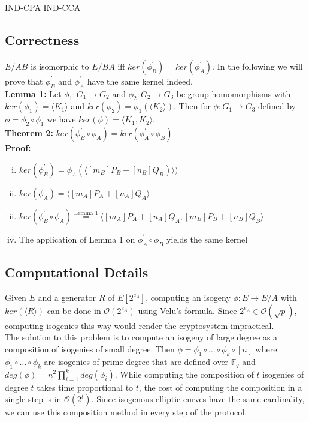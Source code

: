 IND-CPA %
IND-CCA %


\subsection{Correctness}
\label{ch:correctness}

$E/AB$ is isomorphic to $E/BA$ iff $ker(\phi_B^{\prime})=ker(\phi_A^{\prime})$. %
In the following we will prove that $\phi_B^{\prime}$ and $\phi_A^{\prime}$ have the same kernel indeed.\\

\textbf{Lemma 1:} Let $\phi_1: G_1 \to G_2$ and $\phi_2: G_2 \to G_3$ be group homomorphisms with $ker(\phi_1) = \langle K_1 \rangle$ and $ker(\phi_2) = \phi_1(\langle K_2 \rangle)$. Then for $\phi:G_1 \to G_3$ defined by $\phi=\phi_2 \circ \phi_1$ we have $ker(\phi) =\langle K_1,K_2\rangle$.\\%

\textbf{Theorem 2:} $ker(\phi_B^{\prime} \circ \phi_A) = ker(\phi_A^{\prime} \circ \phi_B)$\\
\textbf{Proof:}
\begin{enumerate}[(i)]
	\item $ker(\phi_B^{\prime})=\phi_A(\langle [m_B]P_B + [n_B]Q_B)\rangle)$
	\item $ker(\phi_A)=\langle [m_A]P_A + [n_A]Q_A\rangle$
	\item $ker(\phi_B^{\prime} \circ \phi_A) \stackrel{\text{Lemma 1}}{=} \langle [m_A]P_A + [n_A]Q_A, [m_B]P_B + [n_B]Q_B \rangle$
	\item The application of Lemma 1 on $\phi_A^{\prime} \circ \phi_B$ yields the same kernel
\end{enumerate}



\subsection{Computational Details}


Given $E$ and a generator $R$ of $E[2^{e_A}]$, computing an isogeny $\phi:E \to E/A$ with $ker(\langle R \rangle)$  can be done in $\mathcal{O}(2^{e_A})$ using Velu's formula. %
Since $2^{e_A} \in \mathcal{O}(\sqrt{p})$, computing isogenies this way would render the cryptosystem impractical.\\
	
The solution to this problem is to compute an isogeny of large degree as a composition of isogenies of small degree. Then $\phi = \phi_1 \circ \dots \circ \phi_k \circ [n]$ where $\phi_1 \circ \dots \circ \phi_k$ are isogenies of prime degree that are defined over $\mathbb{F}_q$ and $deg(\phi) = n^2 \prod^k_{i=1} deg(\phi_i)$. While computing the composition of $t$ isogenies of degree $t$ takes time proportional to $t$, the cost of computing the composition in a single step is in $\mathcal{O}(2^t)$. Since isogenous elliptic curves have the same cardinality, we can use this composition method in every step of the protocol.
